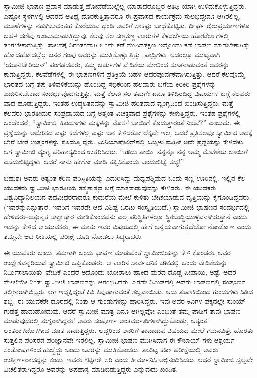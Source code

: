 ಸ್ವಾಮೀಜಿ ಭಾಷಣ ಪ್ರವಾಸ ಮಾಡುತ್ತ ಹೋದೆಡೆಯಲ್ಲೆಲ್ಲ ಯಾರಾದರೊಬ್ಬರ ಅತಿಥಿ ಯಾಗಿ ಉಳಿದುಕೊಳ್ಳುತ್ತಿದ್ದರು. ಎಷ್ಟೋ ಸ್ಥಳಗಳಲ್ಲಿ ಆದರದ ಆತಿಥ್ಯ ದೊರಕುತ್ತಿತ್ತಾದರೂ ಈ ಪ್ರವಾಸದ ಕಾರ್ಯಕ್ರಮ ಸುಲಭದ್ದೇನೂ ಆಗಿರಲಿಲ್ಲ. ಮೂಳೆಗಳನ್ನು ನಡುಗಿಸುವಂತಹ ಕೊರೆಯುವ ಥಂಡಿ ಅವರಿಗೆ ಸಾಕಷ್ಟು ಬಾಧೆಕೊಟ್ಟಿತು. ದೀರ್ಘ ರೈಲುಪ್ರಯಾಣಗಳೂ ಬಹಳ ದಣಿವು ಉಂಟುಮಾಡುತ್ತಿದ್ದುವು. ಕೆಲವು ಸಲ ಸಣ್ಣಸಣ್ಣ ಊರುಗಳ ಕೆಳದರ್ಜೆಯ ಹೋಟೆಲು ಗಳಲ್ಲಿ ತಂಗಬೇಕಾಗುತ್ತಿತ್ತು. ಸಾಲದಕ್ಕೆ ನಿರಂತರವಾಗಿ ಒಂದು ಕಡೆ ಮುಗಿದತಕ್ಷಣ ಇನ್ನೊಂದು ಕಡೆ ಭಾಷಣ ಮಾಡಬೇಕಾಗಿತ್ತು. ಹೋದಹೋದಲ್ಲೆಲ್ಲ ಜನರ ಗಂಪು ಅವರನ್ನು ಮುತ್ತಿಕೊಳ್ಳು ತ್ತಿತ್ತು. ಪಾದ್ರಿಗಳು, ಅದರಲ್ಲೂ ಮುಖ್ಯವಾಗಿ ‘ಯೂನಿಟೇರಿಯನ್​’ ಪಂಗಡದವರು, ತಮ್ಮ ಚರ್ಚುಗಳ ವೇದಿಕೆಯ ಮೇಲಿಂದ ಮಾತನಾಡುವಂತೆ ಅವರನ್ನು ಕಾಡುತ್ತಿದ್ದರು. ಕೆಲವೆಡೆಗಳಲ್ಲಿ ಈ ಭಾಷಣಗಳಿಗೆ ಪ್ರತಿಕ್ರಿಯೆ ಬಹಳ ಆದರಪೂರ್ವಕವಾಗಿರುತ್ತಿತ್ತು. ಆದರೆ ಕೆಲವೊಮ್ಮೆ ಭಾರತದ ಬಗ್ಗೆ ತಪ್ಪು ತಿಳಿವಳಿಕೆಯನ್ನು ಹೊಂದಿದ್ದ ಸಭಿಕರಿಂದ ಹಲವಾರು ಬಗೆಯ ಕಿರಿಕಿರಿ ಪ್ರಶ್ನೆಗಳನ್ನು ಎದುರಿಸಬೇಕಾದ ಸಂದರ್ಭವೊದಗುತ್ತಿತ್ತು. ಮತ್ತೆ ಕೆಲವು ಸಲ ತಮಗೇ ಏನೂ ತಿಳಿದಿರದಿದ್ದ ವಿಷಯಗಳ ಬಗ್ಗೆ ಕೆಲವರು ವಾದ ಹೂಡುತ್ತಿದ್ದರು. ಇಂತಹ ಉದ್ಧಟತನವನ್ನು ಸ್ವಾಮೀಜಿ ಹರಿತವಾದ ವ್ಯಂಗ್ಯದಿಂದ ಖಂಡಿಸುತ್ತಿದ್ದರು. ಮತ್ತೆ ಕೆಲವರು ಭಾರತೀಯರ ಸಂಪ್ರದಾಯದ ಬಗ್ಗೆ ಅತ್ಯಂತ ವಿಚಿತ್ರವಾದ ಪ್ರಶ್ನೆಗಳನ್ನು ಕೇಳುತ್ತಿದ್ದರು. ಇಂತಹ ಪ್ರಶ್ನೆಗಳಲ್ಲಿ ಒಂದೆಂದರೆ, “ಸ್ವಾಮೀಜಿ, ಹಿಂದೂಗಳು ಮಕ್ಕಳನ್ನು ಮೊಸಳೆ ಬಾಯಿಗೆ ಕೊಡುತ್ತಾರಂತೆ ನಿಜವೆ?” ಎಂಬುದು. ಈ ಪ್ರಶ್ನೆಯನ್ನು ಅಮೆರಿಕದ ಎಷ್ಟು ಕಡೆಗಳಲ್ಲಿ ಎಷ್ಟು ಜನ ಕೇಳಿದರೋ ಲೆಕ್ಕವೇ ಇಲ್ಲ. ಆದರೆ ಪ್ರತಿಸಲವೂ ಸ್ವಾಮೀಜಿ ಅದಕ್ಕೆ ಬೇರೆ ಬೇರೆ ಉತ್ತರಗಳನ್ನು ಕೊಡುತ್ತಿ ದ್ದರು. ಮಿನಿಯಾಪೊಲಿಸ್​ನಲ್ಲಿ ಒಬ್ಬಳು ಮಹಿಳೆ ಅದೇ ಪ್ರಶ್ನೆಯನ್ನು ಕೇಳಿದಳು. ಆಗ ಸ್ವಾಮೀಜಿ ವ್ಯಂಗ್ಯ ಪರಿಹಾಸ್ಯದಿಂದ ಉತ್ತರಿಸಿದರು. “ಹೌದು ತಾಯಿ. ನನ್ನನ್ನೂ ನನ್ನ ಅಮ್ಮ ಮೊಸಳೆಯ ಬಾಯಿಗೆ ಎಸೆದುಬಿಟ್ಟಿದ್ದಳು. ಆದರೆ ನಾನು ಹೇಗೋ ಮಾಡಿ ತಪ್ಪಿಸಿಕೊಂಡು ಬಂದುಬಿಟ್ಟೆ, ಸದ್ಯ!”

ಬಹುಶಃ ಅವರು ಅತ್ಯಂತ ಕಠಿಣ ಪರಿಸ್ಥಿತಿಯನ್ನು ಎದುರಿಸಿದ್ದು ಮಧ್ಯಪಶ್ಚಿಮದ ಒಂದು ಸಣ್ಣ ಊರಿನಲ್ಲಿ. ಇಲ್ಲಿನ ಕೆಲ ಯುವಕರು ಸ್ವಾಮೀಜಿ ಭಾರತೀಯ ತತ್ತ್ವಶಾಸ್ತ್ರದ ಬಗ್ಗೆ ಮಾತನಾಡುವುದನ್ನು ಕೇಳಿದರು. ಈ ಯುವಕರು ವಿಶ್ವವಿದ್ಯಾನಿಲಯದ ಪದವೀಧರರಾದರೂ ಕುದುರೆಯ ಮೇಲೆ ಕುಳಿತು ಬೇಟೆಯಾಡುವ ವೃತ್ತಿಯನ್ನು ಕೈಗೊಂಡಿದ್ದವರು. (ಇವರನ್ನುಎನ್ನುತ್ತಾರೆ. ಇವರಿಗೆ ಇವರದೇ ಆದ ವಿಶಿಷ್ಟ ಒರಟು ಸಂಸ್ಕೃತಿಯಿದೆ.) ಸ್ವಾಮೀಜಿ ಭಾಷಣದ ಸಂದರ್ಭದಲ್ಲಿ ಹೇಳಿದರು–ಅತ್ಯುನ್ನತ ಸಾಕ್ಷಾತ್ಕಾರ ಮಾಡಿಕೊಂಡವನು ಎಲ್ಲ ಪರಿಸ್ಥಿತಿಗಳಲ್ಲೂ ಸ್ಥಿರಬುದ್ಧಿಯುಳ್ಳವನಾಗಿರುತ್ತಾನೆ ಎಂದು. ಇದನ್ನು ಕೇಳಿದ ಆ ಯುವಕರು, ಈ ಮಾತು ಇವರ ವಿಷಯದಲ್ಲಿ ಹೇಗೆ ಅನ್ವಯವಾಗುತ್ತದೆಯೋ ನೋಡೋಣ ಎಂದು ತಮ್ಮದೇ ಆದ ರೀತಿಯಲ್ಲಿ ಪರೀಕ್ಷೆ ಮಾಡಿ ನೋಡಲು ಸಿದ್ಧರಾದರು.

ಈ ಯುವಕರು ಬಂದು, ತಮಗಾಗಿ ಒಂದು ಭಾಷಣ ಮಾಡುವಂತೆ ಸ್ವಾಮೀಜಿಯನ್ನು ಕೇಳಿ ಕೊಂಡರು. ಅವರ ಉದ್ದೇಶವನ್ನರಿಯದೆ ಸ್ವಾಮೀಜಿ ಒಪ್ಪಿಕೊಂಡರು. ಆ ಊರಿನ ಸಾರ್ವಜನಿಕ ಚೌಕದಲ್ಲಿ ಒಂದು ವೇದಿಕೆಯನ್ನು ನಿರ್ಮಿಸಲಾಯಿತು. ವೇದಿಕೆ ಎಂದರೆ ಅದೊಂದು ಬೋರಾಲು ಹಾಕಿದ ಮರದ ದೊಡ್ಡ ಪೀಪಾಯಿ, ಅಷ್ಟೆ. ಅದರ ಮೇಲೆಯೇ ನಿಂತು ಸ್ವಾಮೀಜಿ ಭಾಷಣವನ್ನು ಆರಂಭಿಸಿದರು. ಎರಡೇ ನಿಮಿಷದಲ್ಲಿ ಅವರು ಭಾಷಣದಲ್ಲಿ ಸಂಪೂರ್ಣ ತಲ್ಲೀನರಾಗಿಬಿಟ್ಟರು. ಆಗ ಇದ್ದಕ್ಕಿದ್ದಂತೆ ಕಿವಿ ಕಿವುಡಾಗುವಂತೆ ಶಬ್ದವಾಯಿತು. ಅದು ತುಪಾಕಿಯಿಂದ ಗುಂಡುಗಳು ಸಿಡಿದ ಶಬ್ದ. ಈ ಯುವಕರೇ ದೂರದಲ್ಲಿ ನಿಂತು ಆ ಗುಂಡುಗಳನ್ನು ಹಾರಿಸಿದ್ದರು. ಇವು ಅವರ ಕಿವಿಗಳ ಪಕ್ಕದಲ್ಲೇ ಸುಂಯ್​ಗುಡತ್ತ ಹಾದುಹೋದುವು. ಆದರೆ ಸ್ವಾಮೀಜಿ ಮಾತ್ರ ಏನೂ ಆಗಿಲ್ಲವೋ ಎಂಬಂತೆ ತಮ್ಮ ಪಾಡಿಗೆ ತಾವು ಭಾಷಣ ಮಾಡುವುದರಲ್ಲಿ ಮಗ್ನರಾಗಿದ್ದರು! ಅವರು ಸಂಪೂರ್ಣ ಅಂತರ್ಮುಖಿಗಳಾಗಿದ್ದುಕೊಂಡು, ಅತ್ಯಂತ ಅಂತರಾಳದೊಳಗಿಂದ ಮಾತ ನಾಡುತ್ತಿದ್ದರು. ಆದ್ದರಿಂದ ಅವರಿಗೆ ತಾವಾಡುವ ವಿಷಯದ ಮೇಲೆ ಗಮನವಿತ್ತೇ ಹೊರತು ಸುತ್ತಲಿನ ಪರಿಸರದ ಪರಿಜ್ಞಾನವೇ ಇರಲಿಲ್ಲ. ಸ್ವಾಮೀಜಿ ಭಾಷಣ ಮುಗಿಸಿದಾಗ ಈ ಕೌಬಾಯ್ ಗಳು ಆಶ್ಚರ್ಯ-ಸಂತೋಷಗಳಿಂದ ಹುಚ್ಚೆದ್ದು ಬಂದು ಅವರನ್ನು ಮುತ್ತಿಕೊಂಡರು. ತಾವಿಟ್ಟ ಕಠಿಣ ಪರೀಕ್ಷೆಯಲ್ಲಿ ಅವರು ಉತ್ತೀರ್ಣರಾದದ್ದನ್ನು ಕಂಡು, ಇವರು ಗಟ್ಟಿಗರೇ ಸರಿ ಎಂದು ತೀರ್ಮಾನಿಸಿ ಅಭಿನಂದಿಸಿದರು. ಆದರೆ ಸ್ವಾಮೀಜಿ ಸ್ವಲ್ಪವೇ ವಿಚಲಿತರಾಗಿದ್ದರೂ ಅವರನ್ನು ಅಪಹಾಸ್ಯ ಮಾಡಿಬಿಡುತ್ತಿದ್ದರು ಎನ್ನುವುದು ಖಂಡಿತ.

